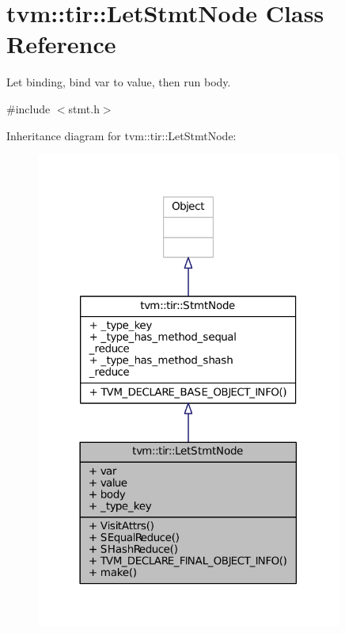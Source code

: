 \hypertarget{classtvm_1_1tir_1_1LetStmtNode}{}\section{tvm\+:\+:tir\+:\+:Let\+Stmt\+Node Class Reference}
\label{classtvm_1_1tir_1_1LetStmtNode}


Let binding, bind var to value, then run body.  




{\ttfamily \#include $<$stmt.\+h$>$}



Inheritance diagram for tvm\+:\+:tir\+:\+:Let\+Stmt\+Node\+:
\nopagebreak
\begin{figure}[H]
\begin{center}
\leavevmode
\includegraphics[width=285pt]{classtvm_1_1tir_1_1LetStmtNode__inherit__graph}
\end{center}
\end{figure}


